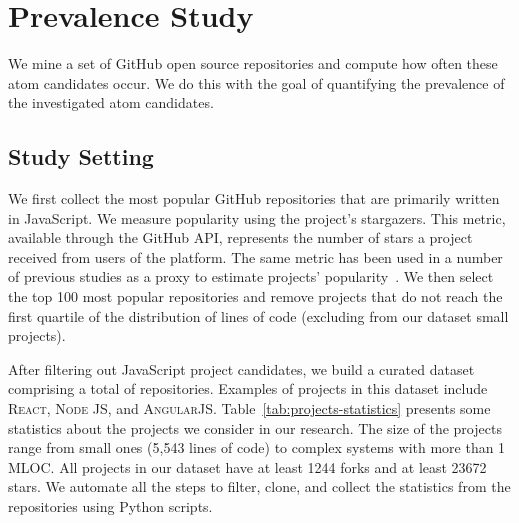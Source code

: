 \section{Prevalence Study}\label{sec:s04}


We mine a set of GitHub open source repositories and compute how often these atom candidates occur. We do this with the goal of quantifying the prevalence of the investigated atom candidates. 

\subsection{Study Setting}

We first collect the most popular GitHub repositories that are primarily written in JavaScript. We measure popularity using the project's stargazers. This metric, available through the GitHub API, represents the number of stars a project received from users of the platform. The same metric has been used in a number of previous studies as a proxy to estimate projects' popularity~\cite{gyimesi2019bugsjs,canedo:esem2020}. We then select the top 100 most popular repositories and remove projects that do not reach the first quartile of the distribution of lines of code (excluding from our dataset small projects). 

After filtering out JavaScript project candidates, we build a curated dataset comprising a total of \minedprojects repositories. Examples of projects in this dataset include \textsc{React}, \textsc{Node JS}, and \textsc{AngularJS}. Table~\ref{tab:projects-statistics} presents some statistics about the projects we consider in our research. The size of the projects range from small ones (5,543 lines of code) to complex systems with more than 1 MLOC. All projects in our dataset have at least \num[group-separator = {,}]{1244} forks and at least \num[group-separator = {,}]{23672} stars. We automate all the steps to filter, clone, and collect the statistics from the repositories using Python scripts.

